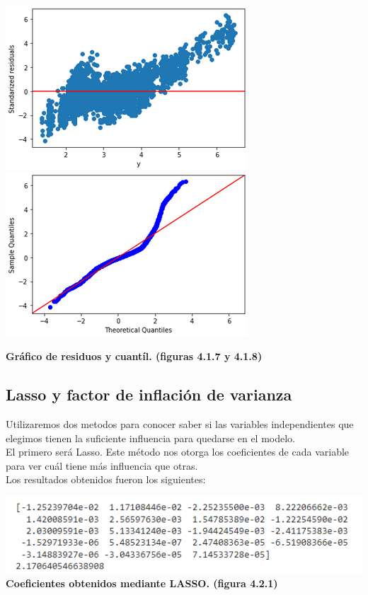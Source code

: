 \documentclass{article}
\begin{document}
        
        \includegraphics[scale=0.6]{images/residuos-stage-OLS1.PNG} 
        \includegraphics[scale=0.6]{images/residuos-stage-quantil4.PNG} \\
        \begin{center}
            \textbf{Gráfico de residuos y cuantíl. (figuras 4.1.7 y 4.1.8)}\\
        \end{center}

    \subsection{Lasso y  factor de inflación de varianza}
    
        Utilizaremos dos metodos para conocer saber si las variables independientes que elegimos tienen la suficiente influencia para quedarse en el modelo.\\
        
        El primero será Lasso. Este método nos otorga los coeficientes de cada variable para ver cuál tiene más influencia que otras.\\
        
        Los resultados obtenidos fueron los siguientes:\\
        
        \begin{center}
                \includegraphics[scale=0.7]{images/stage-lasso.PNG} \\
                \textbf{Coeficientes obtenidos mediante LASSO. (figura 4.2.1)}
        \end{center}
        
\end{document}
